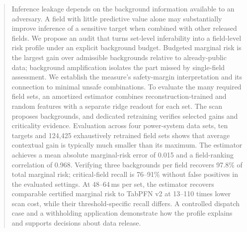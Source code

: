 \begin{abstract}
Inference leakage depends on the background information available to an adversary. A field with little predictive value alone may substantially improve inference of a sensitive target when combined with other released fields. We propose an audit that turns set-level inferability into a field-level risk profile under an explicit background budget. Budgeted marginal risk is the largest gain over admissible backgrounds relative to already-public data; background amplification isolates the part missed by single-field assessment. We establish the measure's safety-margin interpretation and its connection to minimal unsafe combinations. To evaluate the many required field sets, an amortized estimator combines reconstruction-trained and random features with a separate ridge readout for each set. The scan proposes backgrounds, and dedicated retraining verifies selected gains and criticality evidence. Evaluation across four power-system data sets, ten targets and 124,425 exhaustively retrained field sets shows that average contextual gain is typically much smaller than its maximum. The estimator achieves a mean absolute marginal-risk error of 0.015 and a field-ranking correlation of 0.968. Verifying three backgrounds per field recovers 97.8\% of total marginal risk; critical-field recall is 76--91\% without false positives in the evaluated settings. At 48--64\,ms per set, the estimator recovers comparable certified marginal risk to TabPFN v2 at 13--110 times lower scan cost, while their threshold-specific recall differs. A controlled dispatch case and a withholding application demonstrate how the profile explains and supports decisions about data release.
\end{abstract}
